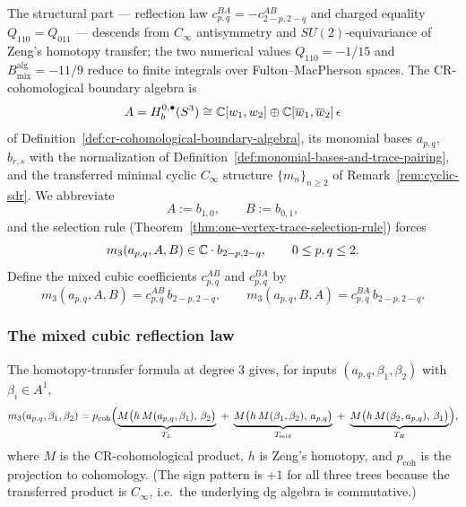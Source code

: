 The structural part — reflection law $c^{BA}_{p,q}=-c^{AB}_{2-p,2-q}$
and charged equality $Q_{110}=Q_{011}$ — descends from $C_\infty$
antisymmetry and $SU(2)$-equivariance of Zeng's homotopy transfer; the
two numerical values $Q_{110}=-1/15$ and $B_{\mathrm{mix}}^{\mathrm{alg}}=-11/9$
reduce to finite integrals over Fulton--MacPherson spaces.
The CR-cohomological boundary algebra is
\[
A=H_b^{0,\bullet}(S^3)\cong\mathbb C[w_1,w_2]\oplus\mathbb C[\overline{w}_1,\overline{w}_2]\,\epsilon
\]
of Definition~\ref{def:cr-cohomological-boundary-algebra}, its monomial bases $a_{p,q}$,
$b_{r,s}$ with the normalization of Definition~\ref{def:monomial-bases-and-trace-pairing},
and the transferred minimal cyclic $C_\infty$ structure $\{m_n\}_{n\ge 2}$ of
Remark~\ref{rem:cyclic-sdr}. We abbreviate
\[
A:=b_{1,0},\qquad B:=b_{0,1},
\]
and the selection rule (Theorem~\ref{thm:one-vertex-trace-selection-rule}) forces
\begin{equation}
\label{eq:mixed-cubic-output}
m_3(a_{p,q},A,B)\in\mathbb C\cdot b_{2-p,2-q},\qquad 0\le p,q\le 2.
\end{equation}
Define the mixed cubic coefficients $c^{AB}_{p,q}$ and $c^{BA}_{p,q}$ by
\begin{equation}
\label{eq:mixed-cubic-def}
m_3(a_{p,q},A,B)=c^{AB}_{p,q}\,b_{2-p,2-q},
\qquad
m_3(a_{p,q},B,A)=c^{BA}_{p,q}\,b_{2-p,2-q}.
\end{equation}

\subsubsection*{The mixed cubic reflection law}

The homotopy-transfer formula at degree $3$ gives, for inputs $(a_{p,q},\beta_1,\beta_2)$
with $\beta_i\in A^1$,
\begin{equation}
\label{eq:m3-hpt-formula}
m_3(a_{p,q},\beta_1,\beta_2)
=
p_{\mathrm{coh}}\Bigl(
\underbrace{M\bigl(h\,M(a_{p,q},\beta_1),\,\beta_2\bigr)}_{T_L}
\;+\;
\underbrace{M\bigl(h\,M(\beta_1,\beta_2),\,a_{p,q}\bigr)}_{T_{\mathrm{mid}}}
\;+\;
\underbrace{M\bigl(h\,M(\beta_2,a_{p,q}),\,\beta_1\bigr)}_{T_R}
\Bigr),
\end{equation}
where $M$ is the CR-cohomological product, $h$ is Zeng's homotopy, and $p_{\mathrm{coh}}$ is
the projection to cohomology. (The sign pattern is $+1$ for all three trees because the
transferred product is $C_\infty$, i.e.\ the underlying dg algebra is commutative.)

